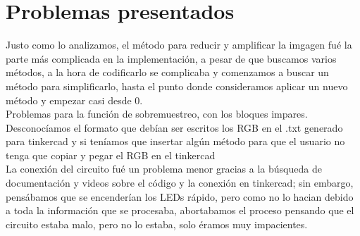 \documentclass{article}
\begin{document}
\section{Problemas presentados}
Justo como lo analizamos, el método para reducir y amplificar la imgagen fué la parte más complicada en la implementación, a pesar de que buscamos varios métodos, a la hora de codificarlo se complicaba y comenzamos a buscar un método para simplificarlo, hasta el punto donde consideramos aplicar un nuevo método y empezar casi desde 0.\\

Problemas para la función de sobremuestreo, con los bloques impares.\\

Desconocíamos el formato que debían ser escritos los RGB en el .txt generado para tinkercad y si teníamos que insertar algún método para que el usuario no tenga que copiar y pegar el RGB en el tinkercad\\

La conexión del circuito fué un problema menor gracias a la búsqueda de documentación y videos sobre el código y la conexión en tinkercad; sin embargo, pensábamos que se encenderían los LEDs rápido, pero como no lo hacian debido a toda la información que se procesaba, abortabamos el proceso pensando que el circuito estaba malo, pero no lo estaba, solo éramos muy impacientes.
\end{document}
